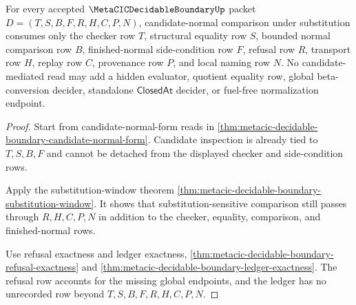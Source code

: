 \begin{theorem}
\label{thm:metacic-decidable-boundary-candidate-normal-substitution-scope}
For every accepted $\MetaCICDecidableBoundaryUp$ packet $D=(T,S,B,F,R,H,C,P,N)$, candidate-normal comparison under substitution consumes only the checker row $T$, structural equality row $S$, bounded normal comparison row $B$, finished-normal side-condition row $F$, refusal row $R$, transport row $H$, replay row $C$, provenance row $P$, and local naming row $N$. No candidate-mediated read may add a hidden evaluator, quotient equality row, global beta-conversion decider, standalone $\mathsf{ClosedAt}$ decider, or fuel-free normalization endpoint.
\end{theorem}
\begin{proof}
Start from candidate-normal-form reads in \autoref{thm:metacic-decidable-boundary-candidate-normal-form}. Candidate inspection is already tied to $T,S,B,F$ and cannot be detached from the displayed checker and side-condition rows.

Apply the substitution-window theorem \autoref{thm:metacic-decidable-boundary-substitution-window}. It shows that substitution-sensitive comparison still passes through $R,H,C,P,N$ in addition to the checker, equality, comparison, and finished-normal rows.

Use refusal exactness and ledger exactness, \autoref{thm:metacic-decidable-boundary-refusal-exactness} and \autoref{thm:metacic-decidable-boundary-ledger-exactness}. The refusal row accounts for the missing global endpoints, and the ledger has no unrecorded row beyond $T,S,B,F,R,H,C,P,N$.
\end{proof}

